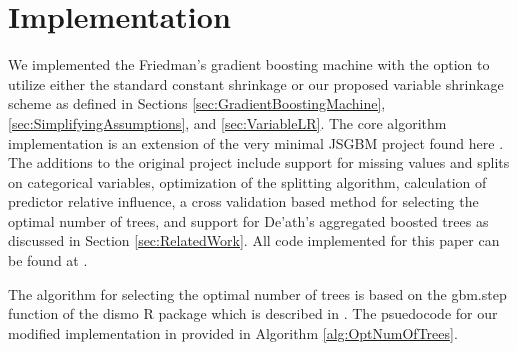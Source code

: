 \documentclass[9pt, conference]{IEEEtran}
\begin{document}
\section{Implementation}
We implemented the Friedman's gradient boosting machine with the option to utilize either the standard constant shrinkage or our proposed variable shrinkage scheme as defined in Sections \ref{sec:GradientBoostingMachine}, \ref{sec:SimplifyingAssumptions}, and \ref{sec:VariableLR}. The core algorithm implementation is an extension of the very minimal JSGBM project found here \cite{jsgbm}. The additions to the original project include support for missing values and splits on categorical variables, optimization of the splitting algorithm, calculation of predictor relative influence, a cross validation based method for selecting the optimal number of trees, and support for De'ath's aggregated boosted trees as discussed in Section \ref{sec:RelatedWork}. All code implemented for this paper can be found at \cite{myGithub}.

The algorithm for selecting the optimal number of trees is based on the gbm.step function of the dismo R package which is described in \cite{ecological}. The psuedocode for our modified implementation in provided in Algorithm \ref{alg:OptNumOfTrees}.
\end{document}
